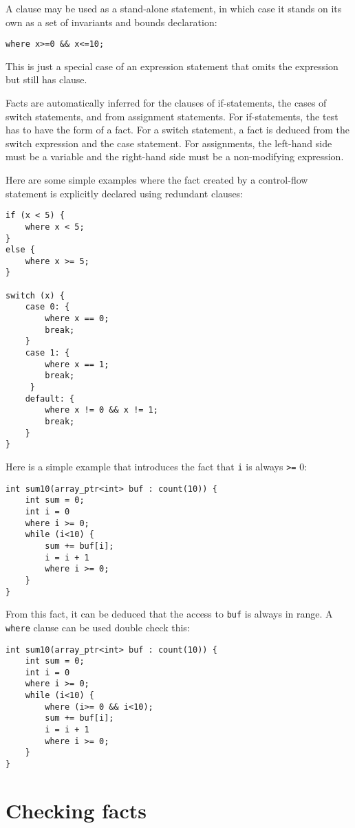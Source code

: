 A  clause may be used as a stand-alone statement, 
in which case it stands on its own as a set of invariants and bounds
declaration:
\begin{verbatim}
where x>=0 && x<=10;
\end{verbatim}
This is just a special case of an expression statement
that omits the expression but still has  clause.

Facts are automatically inferred for the clauses of if-statements, 
the cases of switch statements, and from assignment statements. 
For if-statements, the test has to have
the form of a fact. For a switch statement, a fact is deduced from the
switch expression and the case statement.  For assignments, the
left-hand side must be a variable and the right-hand side must be
a non-modifying expression.

Here are some simple examples where the fact created by a control-flow
statement is explicitly declared using redundant  clauses:

\begin{verbatim}
if (x < 5) {
    where x < 5;
}
else {
    where x >= 5;
} 

switch (x) {
    case 0: {
        where x == 0;
        break;
    }
    case 1: {
        where x == 1;
        break;
     }   
    default: {
        where x != 0 && x != 1;
        break;
    }
}
\end{verbatim}

Here is a simple example that introduces the fact that \texttt{i} is always
\texttt{>=} 0:

\begin{verbatim}
int sum10(array_ptr<int> buf : count(10)) {
    int sum = 0;
    int i = 0
    where i >= 0;
    while (i<10) {
        sum += buf[i];
        i = i + 1
        where i >= 0;
    }
}
\end{verbatim}

From this fact, it can be deduced that the access to \texttt{buf} is always in
range. A \texttt{where} clause can be used double check this:

\begin{verbatim}
int sum10(array_ptr<int> buf : count(10)) {
    int sum = 0;
    int i = 0
    where i >= 0;
    while (i<10) {
        where (i>= 0 && i<10);
        sum += buf[i];
        i = i + 1
        where i >= 0;
    }
}
\end{verbatim}

\section{Checking facts}

